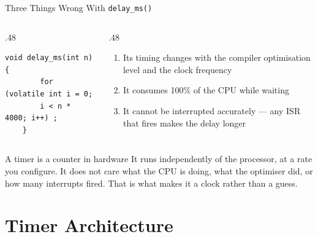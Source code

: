 \documentclass[9pt,aspectratio=169,xcolor=table]{beamer}
\begin{document}
\begin{frame}[fragile]{Three Things Wrong With \texttt{delay\_ms()}}
    \begin{columns}[T]
    \begin{column}{.48\textwidth}
\begin{lstlisting}[style=myc]
	void delay_ms(int n) {
		for (volatile int i = 0;
		i < n * 4000; i++) ;
	}
\end{lstlisting}
    \end{column}
    \begin{column}{.48\textwidth}
        \begin{enumerate}
            \item Its timing changes with the \alert{compiler optimisation
                  level} and the \alert{clock frequency}
            \item It consumes \alert{100\%} of the CPU while waiting
            \item It cannot be \alert{interrupted accurately} --- any ISR that
                  fires makes the delay longer
        \end{enumerate}
    \end{column}
    \end{columns}

    \vspace{3mm}
    \begin{block}{A timer is a counter in hardware}
        It runs independently of the processor, at a rate you configure. It does
        not care what the CPU is doing, what the optimiser did, or how many
        interrupts fired. \alert{That is what makes it a clock rather than a
        guess.}
    \end{block}
\end{frame}

\section{Timer Architecture}
\end{document}
